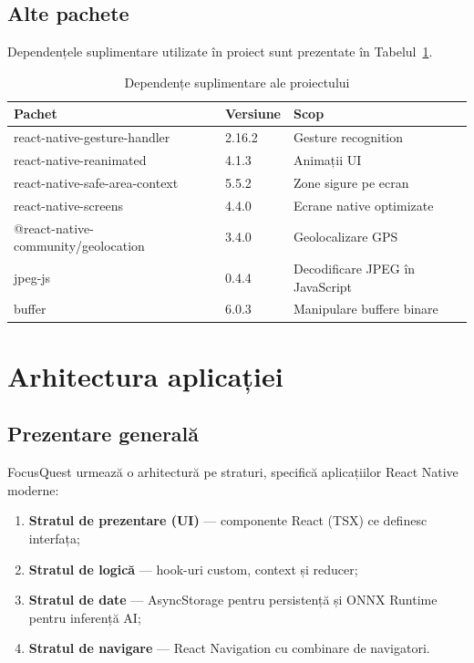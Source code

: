 \documentclass[12pt, a4paper, twoside]{report}
\numberwithin{equation}{section}
\begin{document}
\section{Alte pachete}

Dependențele suplimentare utilizate în proiect sunt prezentate în Tabelul~\ref{tab:deps}.

\begin{table}[H]
\centering
\caption{Dependențe suplimentare ale proiectului}
\label{tab:deps}
\begin{tabular}{lll}
\toprule
\textbf{Pachet} & \textbf{Versiune} & \textbf{Scop} \\
\midrule
react-native-gesture-handler & 2.16.2 & Gesture recognition \\
react-native-reanimated & 4.1.3 & Animații UI \\
react-native-safe-area-context & 5.5.2 & Zone sigure pe ecran \\
react-native-screens & 4.4.0 & Ecrane native optimizate \\
@react-native-community/geolocation & 3.4.0 & Geolocalizare GPS \\
jpeg-js & 0.4.4 & Decodificare JPEG în JavaScript \\
buffer & 6.0.3 & Manipulare buffere binare \\
\bottomrule
\end{tabular}
\end{table}

\chapter{Arhitectura aplicației}

\section{Prezentare generală}

FocusQuest urmează o arhitectură pe straturi, specifică aplicațiilor React Native moderne:

\begin{enumerate}
  \item \textbf{Stratul de prezentare (UI)} — componente React (TSX) ce definesc interfața;
  \item \textbf{Stratul de logică} — hook-uri custom, context și reducer;
  \item \textbf{Stratul de date} — AsyncStorage pentru persistență și ONNX Runtime pentru
    inferență AI;
  \item \textbf{Stratul de navigare} — React Navigation cu combinare de navigatori.
\end{enumerate}
\end{document}
